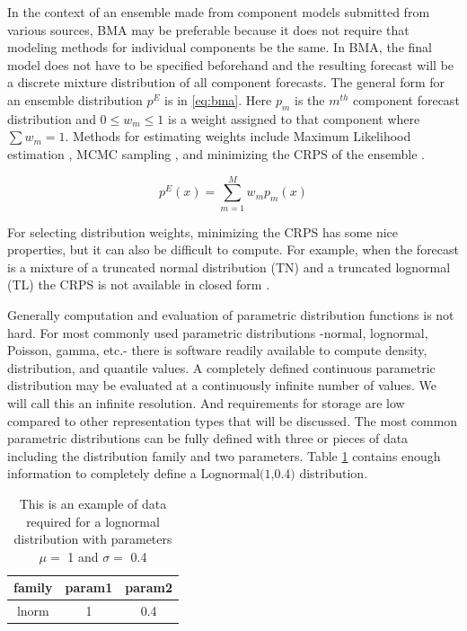 \documentclass[11pt,notitlepage]{isuthesis}
\begin{document}
In the context of an ensemble made from component models submitted from various
sources,
BMA may be preferable because it does not require that modeling methods for 
individual components be the same. 
In BMA, the final model does not have to be specified
beforehand and the resulting forecast will be a discrete mixture distribution
of all component forecasts. The general form for an ensemble distribution $p^E$
is in \eqref{eq:bma}. Here $p_m$ is the $m^{th}$ component forecast 
distribution and 
$0 \leq w_m \leq 1$ is a weight assigned to that component where $\sum w_m = 1$.
Methods for estimating weights include Maximum Likelihood estimation
\cite{raftery2005using}, MCMC 
sampling \cite{vrugt2008ensemble},
and minimizing the CRPS of the ensemble
\cite{baran2018combining}.

\begin{equation}
\label{eq:bma}
  p^E(x) = \sum_{m=1}^M w_mp_m(x)
\end{equation}


For selecting distribution weights, minimizing the CRPS has some nice 
properties, but it can also be
difficult to compute. For example, when the forecast is a mixture of a 
truncated normal distribution (TN) and a truncated lognormal (TL) the CRPS is 
not available in closed form \cite{baran2018combining}.

Generally computation and evaluation of parametric distribution functions is not 
hard. 
For most commonly used parametric distributions -normal, lognormal, Poisson,
gamma, etc.- there is software readily available to compute density, 
distribution, and quantile values. 
A completely defined continuous parametric distribution may be evaluated at a
continuously
infinite number of values. We will call this an infinite resolution.
And requirements for storage are low 
compared to other representation types that will be discussed. The most common
parametric distributions can be fully defined with three or pieces of data
including
the distribution family and two parameters. Table \ref{table:pstor} 
contains
enough information to completely define a $\mbox{Lognormal(1,0.4)}$ 
distribution.

\begin{table}[h!]
\begin{center}
\begin{minipage}{10cm}
\captionsetup{font=scriptsize}
\centering
 \begin{tabular}{|c c c|} 
 \hline
 family & param1 & param2 \\ [0.5ex] 
 \hline
 lnorm & 1 & 0.4 \\ 
 \hline
 \end{tabular}
 \caption[Parametric distribution storage]{This is an example of data required
 for a lognormal 
 distribution with 
 parameters $\mu = $ 1 and $\sigma =$ 0.4}
 \label{table:pstor}
 \end{minipage}
 \end{center}
\end{table}
\end{document}
